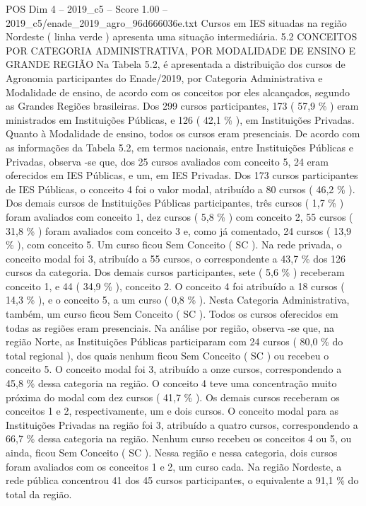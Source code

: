 \begin{textsample}{POS Dim 4 – 2019\_c5 – Score 1.00 – 2019\_c5/enade\_2019\_agro\_96d666036e.txt}
Cursos em IES situadas na região Nordeste ( linha verde ) apresenta uma situação intermediária. 5.2 CONCEITOS POR CATEGORIA ADMINISTRATIVA, POR MODALIDADE DE ENSINO E GRANDE REGIÃO Na Tabela 5.2, é apresentada a distribuição dos cursos de Agronomia participantes do Enade/2019, por Categoria Administrativa e Modalidade de ensino, de acordo com os conceitos por eles alcançados, segundo as Grandes Regiões brasileiras.
Dos 299 cursos participantes, 173 ( 57,9 \% ) eram ministrados em Instituições Públicas, e 126 ( 42,1 \% ), em Instituições Privadas.
Quanto à Modalidade de ensino, todos os cursos eram presenciais.
De acordo com as informações da Tabela 5.2, em termos nacionais, entre Instituições Públicas e Privadas, observa -se que, dos 25 cursos avaliados com conceito 5, 24 eram oferecidos em IES Públicas, e um, em IES Privadas.
Dos 173 cursos participantes de IES Públicas, o conceito 4 foi o valor modal, atribuído a 80 cursos ( 46,2 \% ).
Dos demais cursos de Instituições Públicas participantes, três cursos ( 1,7 \% ) foram avaliados com conceito 1, dez cursos ( 5,8 \% ) com conceito 2, 55 cursos ( 31,8 \% ) foram avaliados com conceito 3 e, como já comentado, 24 cursos ( 13,9 \% ), com conceito 5.
Um curso ficou Sem Conceito ( SC ).
Na rede privada, o conceito modal foi 3, atribuído a 55 cursos, o correspondente a 43,7 \% dos 126 cursos da categoria.
Dos demais cursos participantes, sete ( 5,6 \% ) receberam conceito 1, e 44 ( 34,9 \% ), conceito 2.
O conceito 4 foi atribuído a 18 cursos ( 14,3 \% ), e o conceito 5, a um curso ( 0,8 \% ).
Nesta Categoria Administrativa, também, um curso ficou Sem Conceito ( SC ).
Todos os cursos oferecidos em todas as regiões eram presenciais.
Na análise por região, observa -se que, na região Norte, as Instituições Públicas participaram com 24 cursos ( 80,0 \% do total regional ), dos quais nenhum ficou Sem Conceito ( SC ) ou recebeu o conceito 5.
O conceito modal foi 3, atribuído a onze cursos, correspondendo a 45,8 \% dessa categoria na região.
O conceito 4 teve uma concentração muito próxima do modal com dez cursos ( 41,7 \% ).
Os demais cursos receberam os conceitos 1 e 2, respectivamente, um e dois cursos.
O conceito modal para as Instituições Privadas na região foi 3, atribuído a quatro cursos, correspondendo a 66,7 \% dessa categoria na região.
Nenhum curso recebeu os conceitos 4 ou 5, ou ainda, ficou Sem Conceito ( SC ).
Nessa região e nessa categoria, dois cursos foram avaliados com os conceitos 1 e 2, um curso cada.
Na região Nordeste, a rede pública concentrou 41 dos 45 cursos participantes, o equivalente a 91,1 \% do total da região.

\end{textsample}
